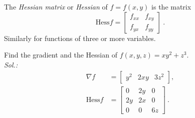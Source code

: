 \begin{definition}
The \emph{Hessian matrix} or \emph{Hessian} of $f=f(x,y)$ is the matrix
\[ \mathrm{Hess} f = \begin{bmatrix}
f_{xx} & f_{xy} \\ f_{yx} & f_{yy}
\end{bmatrix} \:. \]
Similarly for functions of three or more variables. 
\end{definition}

\begin{example}
Find the gradient and the Hessian of $f(x,y,z) = xy^2 + z^3$.\\
{\it Sol.:}
\begin{equation*}
\begin{split}
\nabla f & = \begin{bmatrix}
y^2 & 2xy & 3z^2
\end{bmatrix},\\
\mathrm{Hess} f & = \begin{bmatrix}
0 & 2y & 0 \\
2y & 2x & 0 \\
0 & 0 & 6z
\end{bmatrix} \:.
\end{split}
\end{equation*}

\end{example}

